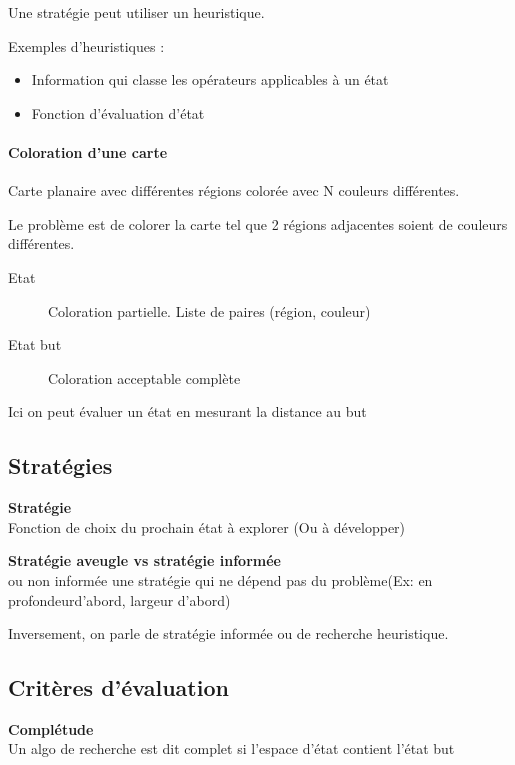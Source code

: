 \documentclass[12pt,a4paper,openany]{book}
\begin{document}
		Une stratégie peut utiliser un heuristique.

			\begin{exemple}
				Exemples d'heuristiques : 
				\begin{itemize}
					\item Information qui classe les opérateurs applicables à un état
					\item Fonction d'évaluation d'état
			\end{itemize}
		\end{exemple}

		\begin{exemple}
			\paragraph{Coloration d'une carte}
			Carte planaire avec différentes régions colorée avec N couleurs différentes.

			Le problème est de colorer la carte tel que 2 régions adjacentes soient de couleurs différentes.

			\begin{description}
				\item[Etat]Coloration partielle. Liste de paires (région, couleur)
				\item[Etat but] Coloration acceptable complète
			\end{description}

			Ici on peut évaluer un état en mesurant la distance  au but
		\end{exemple}

		\subsection{Stratégies}
		\begin{definition}
			\textbf{Stratégie}\\ Fonction de choix du prochain état à explorer (Ou à développer)
		\end{definition}

		\begin{definition}
			\textbf{Stratégie aveugle vs stratégie informée}\\ou non informée une stratégie qui ne dépend pas du problème(Ex: en profondeurd'abord, largeur d'abord)

			Inversement, on parle de stratégie informée ou de recherche heuristique.
		\end{definition}

		\subsection{Critères d'évaluation}
		\begin{definition}
			\textbf{Complétude}\\ 
			Un algo de recherche est dit complet si l'espace d'état contient l'état but
		\end{definition}
\end{document}

